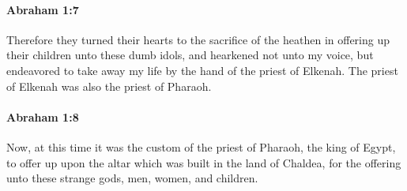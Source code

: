 
		\paragraph{Abraham 1:7} %
			\label{ABRAHAM-1-7}

			Therefore they turned their hearts to the sacrifice of the heathen in offering up their children unto these dumb idols, and hearkened not unto my voice, but endeavored to take away my life by the hand of the priest of Elkenah.  The priest of Elkenah was also the priest of Pharaoh.


		\paragraph{Abraham 1:8} %
			\label{ABRAHAM-1-8}

			Now, at this time it was the custom of the priest of Pharaoh, the king of Egypt, to offer up upon the altar which was built in the land of Chaldea, for the offering unto these strange gods, men, women, and children.

